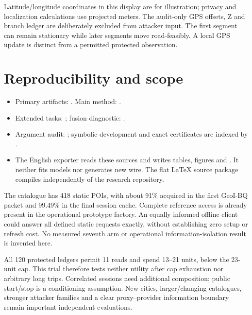 
Latitude/longitude coordinates in this display are for illustration;
privacy and localization calculations use projected meters.
The audit-only GPS offsets, Z and branch ledger are deliberately excluded
from attacker input. The first segment can remain stationary while later
segments move road-feasibly. A local GPS update is distinct from a permitted
protected observation.

\section{Reproducibility and scope}
\begin{itemize}[leftmargin=*]
\item Primary artifacts: .
Main method: .
\item Extended tasks: ;
fusion diagnostic: .
\item Argument audit: ;
symbolic development and exact certificates are indexed by
.
\item The English exporter reads these sources and writes tables, figures and
. It neither fits models nor generates new wire.
The flat LaTeX source package compiles independently of the research repository.
\end{itemize}
The catalogue has 418 static POIs, with about 91\% acquired in the first
GeoI-BQ packet and 99.49\% in the final session cache. Complete reference
access is already present in the operational prototype factory.
An equally informed offline client could answer all defined static requests
exactly, without establishing zero setup or refresh cost. No measured seventh
arm or operational information-isolation result is invented here.

All 120 protected ledgers permit 11 reads and spend 13--21 units, below the
23-unit cap. This trial therefore tests neither utility after cap exhaustion
nor arbitrary long trips. Correlated sessions need additional composition;
public start/stop is a conditioning assumption. New cities, larger/changing
catalogues, stronger attacker families and a clear proxy--provider information
boundary remain important independent evaluations.
